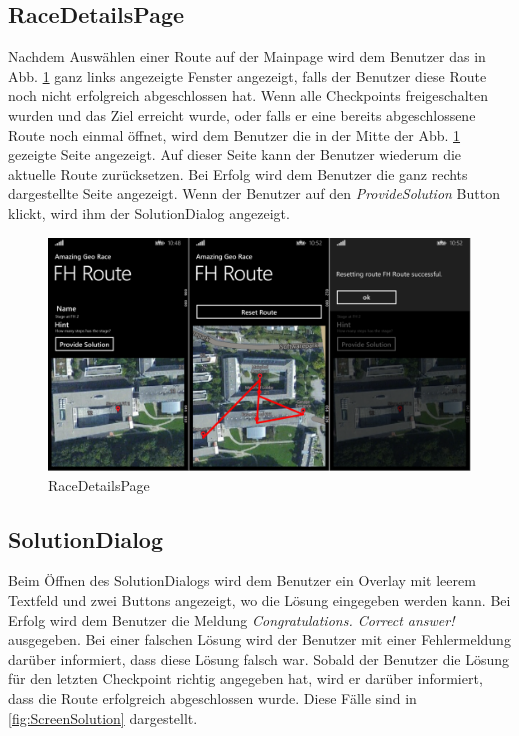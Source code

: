 \documentclass[a4paper,ngerman]{scrartcl}
\begin{document}
\newpage
\subsection{RaceDetailsPage}
Nachdem Auswählen einer Route auf der Mainpage wird dem Benutzer das in Abb. \ref{fig:ScreenDetails} ganz links angezeigte Fenster angezeigt, falls der Benutzer diese Route noch nicht erfolgreich abgeschlossen hat. Wenn alle Checkpoints freigeschalten wurden und das Ziel erreicht wurde, oder falls er eine bereits abgeschlossene Route noch einmal öffnet, wird dem Benutzer die in der Mitte der Abb. \ref{fig:ScreenDetails} gezeigte Seite angezeigt. Auf dieser Seite kann der Benutzer wiederum die aktuelle Route zurücksetzen. Bei Erfolg wird dem Benutzer die ganz rechts dargestellte Seite angezeigt. Wenn der Benutzer auf den \textit{ProvideSolution} Button klickt, wird ihm der SolutionDialog angezeigt.
\begin{figure}[h]
	\centering
	\includegraphics[width=.95\textwidth]{images/routeDetailsPage_Stati}
	\caption{RaceDetailsPage}
		\label{fig:ScreenDetails}
\end{figure}


\newpage
\subsection{SolutionDialog}
Beim Öffnen des SolutionDialogs wird dem Benutzer ein Overlay mit leerem Textfeld und zwei Buttons angezeigt, wo die Lösung eingegeben werden kann. Bei Erfolg wird dem Benutzer die Meldung \textit{Congratulations. Correct answer!} ausgegeben. Bei einer falschen Lösung wird der Benutzer mit einer Fehlermeldung darüber informiert, dass diese Lösung falsch war. Sobald der Benutzer die Lösung für den letzten Checkpoint richtig angegeben hat, wird er darüber informiert, dass die Route erfolgreich abgeschlossen wurde. Diese Fälle sind in  \ref{fig:ScreenSolution} dargestellt.
\end{document}
